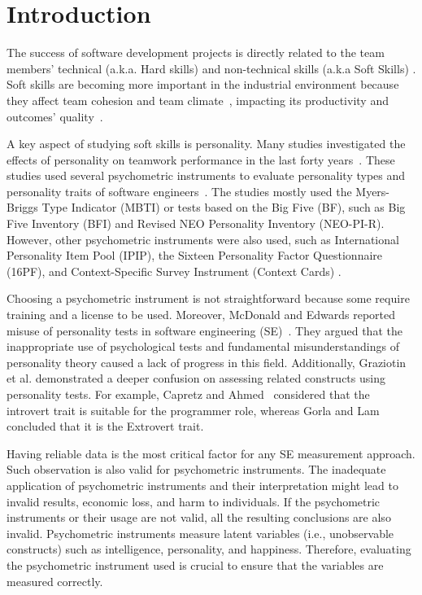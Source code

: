 \section{Introduction}

The success of software development projects is directly related to the team members’ technical (a.k.a. Hard skills) and non-technical skills (a.k.a Soft Skills) \cite{canedo2019factors}. Soft skills are becoming more important in the industrial environment because they affect team cohesion and team climate~\cite{gilal2017effective, ruiz2019understanding}, impacting its productivity and outcomes' quality~\cite{gomesevaluating, Iqbal2019BigfivePT}. 

A key aspect of studying soft skills is personality. Many studies investigated the effects of personality on teamwork performance in the last forty years~\cite{cruz2015forty, soomro2016effect}. These studies used several psychometric instruments to evaluate personality types and personality traits of software engineers~\cite{yilmaz2017examination, cruz2015forty, soomro2016effect}. The studies mostly used the Myers-Briggs Type Indicator (MBTI) or tests based on the Big Five (BF), such as Big Five Inventory (BFI) and Revised NEO Personality Inventory (NEO-PI-R). However, other psychometric instruments were also used, such as International Personality Item Pool (IPIP), the Sixteen Personality Factor Questionnaire (16PF), and Context-Specific Survey Instrument (Context Cards) \cite{cruz2015forty}. %

Choosing a psychometric instrument is not straightforward because some require training and a license to be used. Moreover, McDonald and Edwards reported misuse of personality tests in software engineering (SE)~\cite{mcdonald2007should}. They argued that the inappropriate use of psychological tests and fundamental misunderstandings of personality theory caused a lack of progress in this field. Additionally, Graziotin et al. \cite{graziotin2020behavioral} demonstrated a deeper confusion on assessing related constructs using personality tests. For example, Capretz and Ahmed~\cite{capretz2010making} considered that the introvert trait is suitable for the programmer role, whereas Gorla and Lam~\cite{gorla2004should} concluded that it is the Extrovert trait. 

Having reliable data is the most critical factor for any SE measurement approach. Such observation is also valid for psychometric instruments. The inadequate application of psychometric instruments and their interpretation might lead to invalid results, economic loss, and harm to individuals. If the psychometric instruments or their usage are not valid, all the resulting conclusions are also invalid. Psychometric instruments measure latent variables (i.e., unobservable constructs) such as intelligence, personality, and happiness. Therefore, evaluating the psychometric instrument used is crucial to ensure that the variables are measured correctly.

